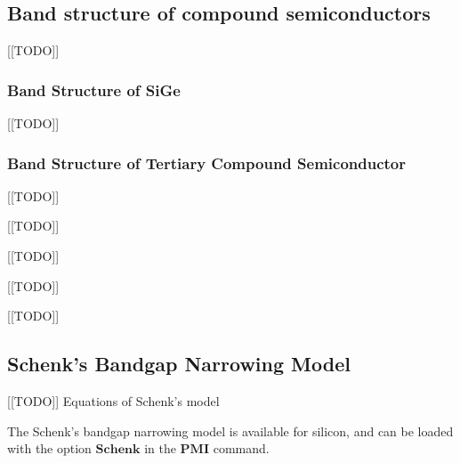 \documentclass[oneside,12pt]{cgd_book}
\begin{document}
\subsection{Band structure of compound semiconductors}
[[TODO]]
\par
\subsubsection{Band Structure of SiGe}
[[TODO]]
\par
\subsubsection{Band Structure of Tertiary Compound Semiconductor}
[[TODO]]
\par
{}[[TODO]]
\par
\par
{}[[TODO]]
\par
\par
{}[[TODO]]
\par
\par
{}[[TODO]]
\par
\par
\subsection{Schenk's Bandgap Narrowing Model}
[[TODO]] Equations of Schenk's model
\par
The Schenk's bandgap narrowing model is available for silicon, and can be loaded with the option
$\mathbf{Schenk}$ in the $\mathbf{PMI}$ command.
\par
\end{document}
